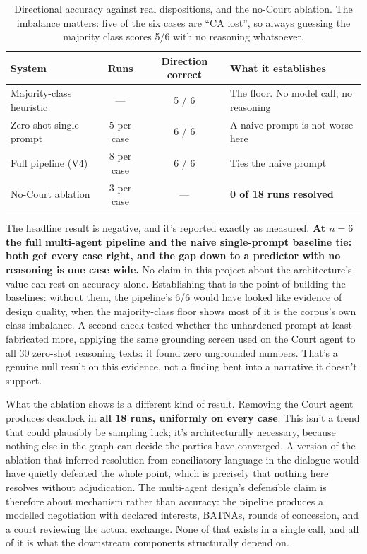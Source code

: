 \begin{table}[htbp]
\centering
\footnotesize
\caption[Baseline comparison]{Directional accuracy against real dispositions, and
the no-Court ablation. The imbalance matters: five of the six cases are ``CA
lost'', so always guessing the majority class scores 5/6 with no reasoning
whatsoever.}
\label{tab:baselines}
\begin{tabular}{|l|c|c|l|}
\hline
\textbf{System} & \textbf{Runs} & \textbf{Direction correct} & \textbf{What it establishes} \\
\hline
Majority-class heuristic & --- & 5 / 6 & The floor. No model call, no reasoning \\
\hline
Zero-shot single prompt & 5 per case & 6 / 6 & A naive prompt is not worse here \\
\hline
Full pipeline (V4) & 8 per case & 6 / 6 & Ties the naive prompt \\
\hline
No-Court ablation & 3 per case & --- & \textbf{0 of 18 runs resolved} \\
\hline
\end{tabular}
\end{table}

The headline result is negative, and it's reported exactly as measured.
\textbf{At $n=6$ the full multi-agent pipeline and the naive single-prompt
baseline tie: both get every case right, and the gap down to a predictor with no
reasoning is one case wide.} No claim in this project about the
architecture's value can rest on accuracy alone. Establishing that is the point
of building the baselines: without them, the pipeline's 6/6 would have looked
like evidence of design quality, when the majority-class floor shows most of it
is the corpus's own class imbalance. A second check tested whether
the unhardened prompt at least fabricated more, applying the same grounding
screen used on the Court agent to all 30 zero-shot reasoning texts: it found
zero ungrounded numbers. That's a genuine null result on this evidence, not a
finding bent into a narrative it doesn't support.

What the ablation shows is a different kind of result. Removing the Court agent
produces deadlock in \textbf{all 18 runs, uniformly on every case}. This isn't a
trend that could plausibly be sampling luck; it's architecturally necessary,
because nothing else in the graph can decide the parties have converged. A
version of the ablation that inferred resolution from conciliatory language in
the dialogue would have quietly defeated the whole point, which is precisely
that nothing here resolves without adjudication. The multi-agent design's
defensible claim is therefore about mechanism rather than accuracy: the
pipeline produces a modelled negotiation with declared interests, BATNAs,
rounds of concession, and a court reviewing the actual exchange. None of that
exists in a single call, and all of it is what the downstream components
structurally depend on.

